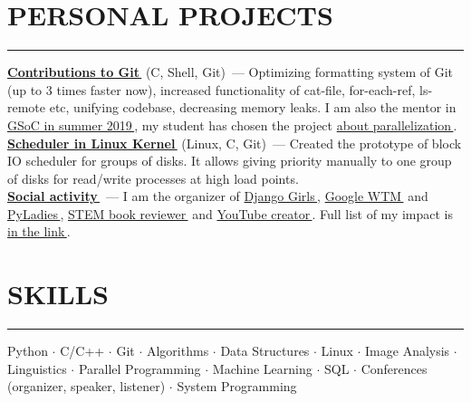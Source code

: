 \documentclass[11pt]{res} %
\let\orighref\href
\renewcommand{\href}[2]{\orighref{#1}{#2\,\faExternalLink}}
\begin{document}
\begin{resume}
\section{\uppercase{Personal Projects}}
\begin{spacing}{0.3}
\textcolor[RGB]{220,220,220}{\rule{\linewidth}{0.4pt}} 
\end{spacing}
\textbf{\href{https://github.com/git/git/commits?author=telezhnaya}{Contributions to Git}} (C, Shell, Git)~--- Optimizing formatting system of Git (up to 3 times faster now), increased functionality of cat-file, for-each-ref, ls-remote etc, unifying codebase, decreasing memory leaks. I am also the mentor in \href{https://summerofcode.withgoogle.com/}{GSoC in summer 2019}, my student has chosen the project \href{https://summerofcode.withgoogle.com/projects/\#6477677521797120}{about parallelization}.\\
\textbf{\href{https://github.com/telezhnaya/linux}{Scheduler in Linux Kernel}} (Linux, C, Git)~--- Created the prototype of block IO scheduler for groups of disks. It allows giving priority manually to one group of disks for read/write processes at high load points.\\
\textbf{\href{https://github.com/telezhnaya/about/blob/master/My_social_impact.md}{Social activity}}~--- I am the organizer of \href{https://djangogirls.org/stpetersburg/}{Django Girls}, \href{https://www.meetup.com/gdgspb/events/262205253/}{Google WTM} and \href{https://spb.pyladies.com/}{PyLadies}, \href{https://dmkpress.com/catalog/computer/}{STEM book reviewer} and \href{https://www.youtube.com/programming_together/}{YouTube creator}. Full list of my impact is \href{https://github.com/telezhnaya/about/blob/master/My_social_impact.md}{in the link}.

\section{\uppercase{Skills}}
\begin{spacing}{0.3}
\textcolor[RGB]{220,220,220}{\rule{\linewidth}{0.4pt}} 
\end{spacing}
Python $\cdot$ C/C++ $\cdot$ Git $\cdot$ Algorithms $\cdot$ Data Structures $\cdot$ Linux $\cdot$ Image Analysis $\cdot$ Linguistics $\cdot$ Parallel Programming $\cdot$ Machine Learning $\cdot$ SQL $\cdot$ Conferences (organizer, speaker, listener) $\cdot$ System Programming


\end{resume}
\end{document}

